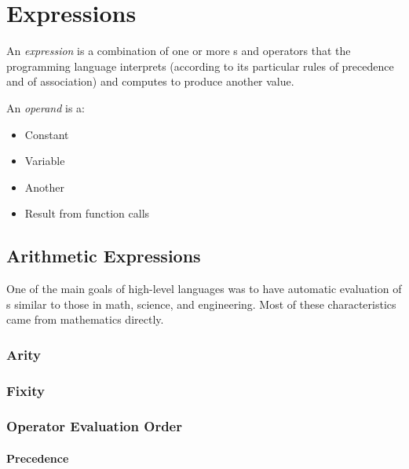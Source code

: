 \section{Expressions}\label{sec:Expressions}
\begin{definition}[Expression]\label{def:Expression}
  An \emph{expression} is a combination of one or more s and operators that the programming language interprets (according to its particular rules of precedence and of association) and computes to produce another value.
\end{definition}

\begin{definition}[Operand]\label{def:Operand}
  An \emph{operand} is a:
  \begin{itemize}[noitemsep]
  \item Constant
  \item Variable
  \item Another 
  \item Result from function calls
  \end{itemize}
\end{definition}

\subsection{Arithmetic Expressions}\label{subsec:Arithmetic_Expressions}
One of the main goals of high-level languages was to have automatic evaluation of s similar to those in math, science, and engineering.
Most of these characteristics came from mathematics directly.

\subsubsection{Arity}\label{subsubsec:Operator_Arity} %
\subsubsection{Fixity}\label{subsubsec:Operator_Fixity} %
\subsubsection{Operator Evaluation Order}\label{subsubsec:Operator_Evaluation_Order}
\paragraph{Precedence}\label{par:Operator_Evaluation_Order-Precedence}
